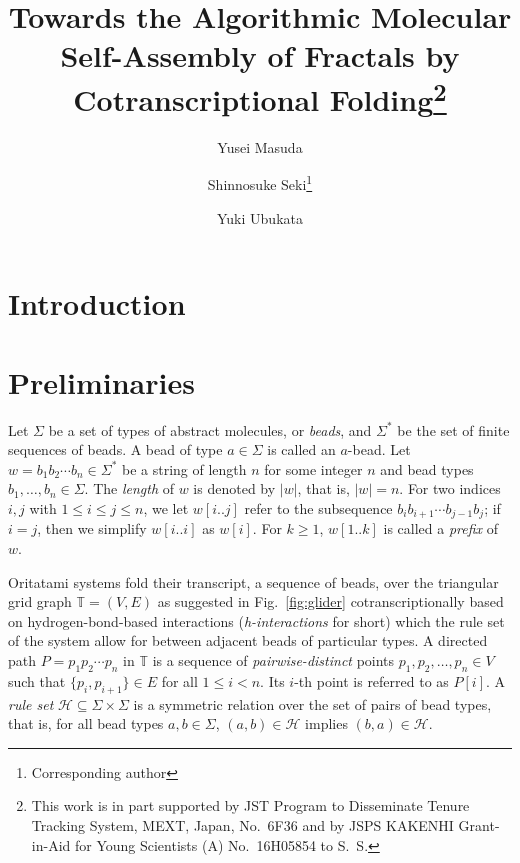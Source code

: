 \documentclass[runningheads]{llncs}
\title{Towards the Algorithmic Molecular Self-Assembly of Fractals by Cotranscriptional Folding\thanks{This work is in part supported by JST Program to Disseminate Tenure Tracking System, MEXT, Japan, No.~6F36 and by JSPS KAKENHI Grant-in-Aid for Young Scientists (A) No.~16H05854 to S.~S.}}
\author{
Yusei Masuda \and 
Shinnosuke Seki\thanks{Corresponding author} \and 
Yuki Ubukata
}
\institute{
Department of Computer and Network Engineering, 
The University of Electro-Communications, 
1-5-1, Chofugaoka, Chofu, Tokyo, 1828585, Japan 
\email{s.seki@uec.ac.jp}
}
\begin{document}
\maketitle

\begin{abstract}

\end{abstract}

	\section{Introduction}

	\section{Preliminaries}

Let $\Sigma$ be a set of types of abstract molecules, or \textit{beads}, and $\Sigma^*$ be the set of finite sequences of beads. 
A bead of type $a \in \Sigma$ is called an $a$-bead. 
Let $w = b_1 b_2\cdots b_n \in \Sigma^*$ be a string of length $n$ for some integer $n$ and bead types $b_1, \ldots, b_n \in \Sigma$.
The \textit{length} of $w$ is denoted by $|w|$, that is, $|w| = n$. 
For two indices $i,j$ with $1\leq i \leq j \leq n$, we let $w[i..j]$ refer to the subsequence $b_i b_{i+1} \cdots b_{j-1} b_{j}$; if $i=j$, then we simplify $w[i..i]$ as $w[i]$.
For $k \ge 1$, $w[1..k]$ is called a \textit{prefix} of $w$. 

Oritatami systems fold their transcript, a sequence of beads, over the triangular grid graph $\mathbb{T} = (V, E)$ as suggested in Fig.~\ref{fig:glider} cotranscriptionally based on hydrogen-bond-based interactions (\textit{h-interactions} for short) which the rule set of the system allow for between adjacent beads of particular types. 
A directed path $P = p_1 p_2 \cdots p_n$ in $\mathbb{T}$ is a sequence of \textit{pairwise-distinct} points $p_1, p_2, \ldots, p_n \in V$ such that $\{p_i, p_{i+1}\} \in E$ for all $1 \leq i < n$.
Its $i$-th point is referred to as $P[i]$. 
A \textit{rule set} $\mathcal{H} \subseteq \Sigma \times \Sigma$ is a symmetric relation over the set of pairs of bead types, that is, for all bead types $a, b \in \Sigma$, $(a, b) \in \mathcal{H}$ implies $(b, a) \in \mathcal{H}$. 
\end{document}
